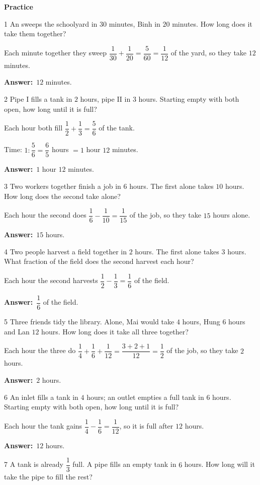 \documentclass[11pt]{article}
\newif\ifsol \solfalse
\providecommand{\AnsWord}{Đáp số}
\newcommand{\dapso}[1]{\par\textbf{\AnsWord:}\ #1}
\newcommand{\probsol}[1]{%
  \begin{lrbox}{\solmeasure}\begin{minipage}{\dimexpr\linewidth-24pt\relax}#1\end{minipage}\end{lrbox}%
  \ifsol
    \begin{solbox}#1\end{solbox}%
  \else
    \setlength{\solht}{\dimexpr\ht\solmeasure+\dp\solmeasure+0.85cm\relax}%
    \ifdim\solht<1.35cm\setlength{\solht}{1.35cm}\fi
    \begin{tcolorbox}[colback=white,colframe=Line,boxrule=0.8pt,arc=5pt,
      left=8pt,right=8pt,top=4pt,bottom=4pt,height=\solht]{\footnotesize\color{Slate}\itshape\WorkWord}\end{tcolorbox}%
  \fi}
\newcommand{\dividerbar}[1]{\par\vspace{0.6em}\noindent
  \begin{tcolorbox}[enhanced,frame hidden,interior hidden,borderline west={5pt}{0pt}{ProbBlue},
    colback=white,left=12pt,right=12pt,top=5pt,bottom=5pt,arc=4pt]
  {\large\bfseries\color{ProbBlue} #1}\end{tcolorbox}\vspace{0.4em}}
\newcommand{\gap}{\vspace{0.3cm}}
\def\WorkWord{Your work:}
\def\AnsWord{Answer}
\begin{document}
\dividerbar{Practice}
\begin{probbox}{1}{\relax}
An sweeps the schoolyard in $30$ minutes, Binh in $20$ minutes. How long does it take them together?
\end{probbox}
\probsol{
Each minute together they sweep $\dfrac1{30}+\dfrac1{20}=\dfrac5{60}=\dfrac1{12}$ of the yard, so they take $12$ minutes.
\dapso{$12$ minutes.}}
\gap
\begin{probbox}{2}{\relax}
Pipe I fills a tank in $2$ hours, pipe II in $3$ hours. Starting empty with both open, how long until it is full?
\end{probbox}
\probsol{
Each hour both fill $\dfrac12+\dfrac13=\dfrac56$ of the tank.\par Time: $1:\dfrac56=\dfrac65$ hours $=1$ hour $12$ minutes.
\dapso{$1$ hour $12$ minutes.}}
\gap
\begin{probbox}{3}{\relax}
Two workers together finish a job in $6$ hours. The first alone takes $10$ hours. How long does the second take alone?
\end{probbox}
\probsol{
Each hour the second does $\dfrac16-\dfrac1{10}=\dfrac1{15}$ of the job, so they take $15$ hours alone.
\dapso{$15$ hours.}}
\gap
\begin{probbox}{4}{\relax}
Two people harvest a field together in $2$ hours. The first alone takes $3$ hours. What fraction of the field does the second harvest each hour?
\end{probbox}
\probsol{
Each hour the second harvests $\dfrac12-\dfrac13=\dfrac16$ of the field.
\dapso{$\dfrac16$ of the field.}}
\gap
\begin{probbox}{5}{\relax}
Three friends tidy the library. Alone, Mai would take $4$ hours, Hung $6$ hours and Lan $12$ hours. How long does it take all three together?
\end{probbox}
\probsol{
Each hour the three do $\dfrac14+\dfrac16+\dfrac1{12}=\dfrac{3+2+1}{12}=\dfrac12$ of the job, so they take $2$ hours.
\dapso{$2$ hours.}}
\gap
\begin{probbox}{6}{\relax}
An inlet fills a tank in $4$ hours; an outlet empties a full tank in $6$ hours. Starting empty with both open, how long until it is full?
\end{probbox}
\probsol{
Each hour the tank gains $\dfrac14-\dfrac16=\dfrac1{12}$, so it is full after $12$ hours.
\dapso{$12$ hours.}}
\gap
\begin{probbox}{7}{\relax}
A tank is already $\dfrac13$ full. A pipe fills an empty tank in $6$ hours. How long will it take the pipe to fill the rest?
\end{probbox}
\end{document}
